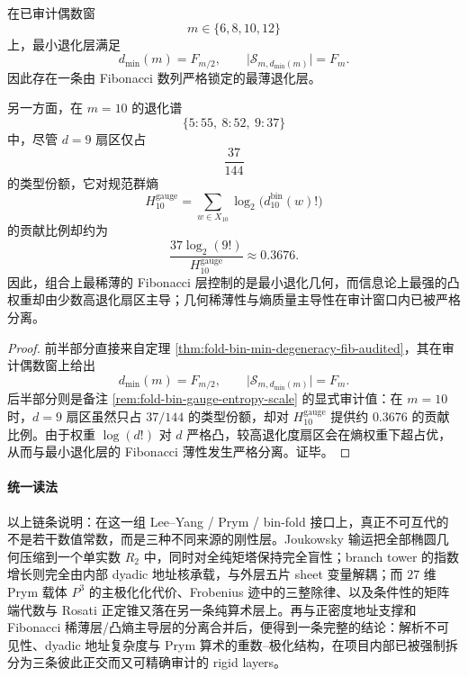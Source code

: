 \begin{proposition}\label{prop:conclusion-fibonacci-thin-layer-convex-entropy-dominance-separation}
在已审计偶数窗
\[
m\in\{6,8,10,12\}
\]
上，最小退化层满足
\[
d_{\min}(m)=F_{m/2},
\qquad
\bigl|\mathcal S_{m,d_{\min}(m)}\bigr|=F_m.
\]
因此存在一条由 Fibonacci 数列严格锁定的最薄退化层。

另一方面，在 \(m=10\) 的退化谱
\[
\{5:55,\ 8:52,\ 9:37\}
\]
中，尽管 \(d=9\) 扇区仅占
\[
\frac{37}{144}
\]
的类型份额，它对规范群熵
\[
H_{10}^{\mathrm{gauge}}=\sum_{w\in X_{10}}\log_2\bigl(d_{10}^{\mathrm{bin}}(w)!\bigr)
\]
的贡献比例却约为
\[
\frac{37\log_2(9!)}{H_{10}^{\mathrm{gauge}}}\approx 0.3676.
\]
因此，组合上最稀薄的 Fibonacci 层控制的是最小退化几何，而信息论上最强的凸权重却由少数高退化扇区主导；几何稀薄性与熵质量主导性在审计窗口内已被严格分离。
\end{proposition}
\begin{proof}
前半部分直接来自定理 \ref{thm:fold-bin-min-degeneracy-fib-audited}，其在审计偶数窗上给出
\[
d_{\min}(m)=F_{m/2},
\qquad
\bigl|\mathcal S_{m,d_{\min}(m)}\bigr|=F_m.
\]
后半部分则是备注 \ref{rem:fold-bin-gauge-entropy-scale} 的显式审计值：在 \(m=10\) 时，\(d=9\) 扇区虽然只占 \(37/144\) 的类型份额，却对 \(H_{10}^{\mathrm{gauge}}\) 提供约 \(0.3676\) 的贡献比例。由于权重 \(\log(d!)\) 对 \(d\) 严格凸，较高退化度扇区会在熵权重下超占优，从而与最小退化层的 Fibonacci 薄性发生严格分离。证毕。
\end{proof}

\paragraph{统一读法}
以上链条说明：在这一组 Lee--Yang / Prym / bin-fold 接口上，真正不可互代的不是若干数值常数，而是三种不同来源的刚性层。Joukowsky 输运把全部椭圆几何压缩到一个单实数 \(R_2\) 中，同时对全纯矩塔保持完全盲性；branch tower 的指数增长则完全由内部 dyadic 地址核承载，与外层五片 sheet 变量解耦；而 \(27\) 维 Prym 载体 \(P^3\) 的主极化化代价、Frobenius 迹中的三整除律、以及条件性的矩阵端代数与 Rosati 正定锥又落在另一条纯算术层上。再与正密度地址支撑和 Fibonacci 稀薄层/凸熵主导层的分离合并后，便得到一条完整的结论：解析不可见性、dyadic 地址复杂度与 Prym 算术的重数--极化结构，在项目内部已被强制拆分为三条彼此正交而又可精确审计的 rigid layers。

\endinput
